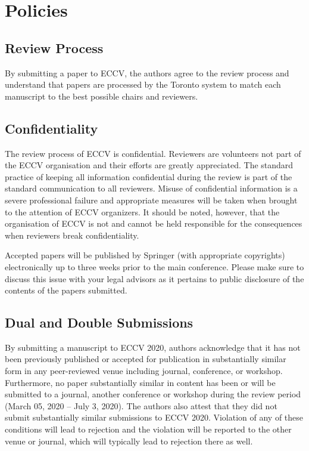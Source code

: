 \documentclass[runningheads]{llncs}
\begin{document}
\section{Policies}
\subsection{Review Process}
By submitting a paper to ECCV, the authors agree to the review process and understand that papers are processed by the Toronto system to match each manuscript to the best possible chairs and reviewers.
\subsection{Confidentiality}
The review process of ECCV is confidential. Reviewers are volunteers not part of the ECCV organisation and their efforts are greatly appreciated. The standard practice of keeping all information confidential during the review is part of the standard communication to all reviewers. Misuse of confidential information is a severe professional failure and  appropriate measures will be taken when brought to the attention of ECCV organizers. It should be noted, however, that the organisation of ECCV is not and cannot be held responsible for the consequences when reviewers break confidentiality.

Accepted papers will be published by Springer (with appropriate copyrights) electronically up to three weeks prior to the main conference. Please make sure to discuss this issue with your legal advisors as it pertains to public disclosure of the contents of the papers submitted.
\subsection{Dual and Double Submissions}
By submitting a manuscript to ECCV 2020, authors acknowledge that it has not been previously published or accepted for publication in substantially similar form in any peer-reviewed venue including journal, conference, or workshop. Furthermore, no paper substantially similar in content has been or will be submitted to a journal, another conference or workshop during the review period (March 05, 2020 – July 3, 2020). The authors also attest that they did not submit substantially similar submissions to ECCV 2020. Violation of any of these conditions will lead to rejection and the violation will be reported to the other venue or journal, which will typically lead to rejection there as well. 
\end{document}
